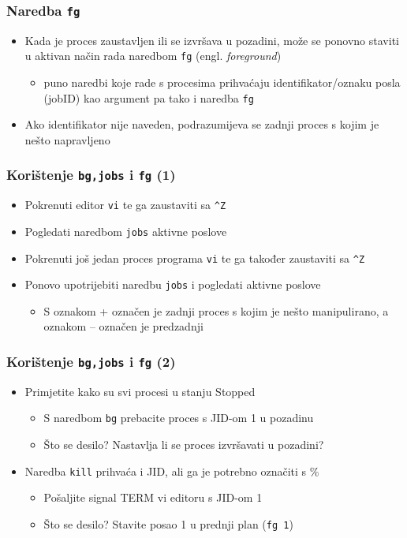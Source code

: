 \documentclass[table,usenames,dvipsnames]{beamer}
\newcommand{\shell}[1]{\texttt{#1}}
\begin{document}
\begin{frame}[t]
\frametitle{Naredba \shell{fg}}
\begin{itemize}
  \item Kada je proces zaustavljen ili se izvršava u pozadini, 
        može se ponovno staviti u aktivan način rada naredbom \shell{fg} 
        (engl. \emph{foreground})
  \begin{itemize}
    \item puno naredbi koje rade s procesima prihvaćaju identifikator/oznaku 
          posla (jobID) kao argument pa tako i naredba \shell{fg}
  \end{itemize}
  \item Ako identifikator nije naveden, podrazumijeva se zadnji proces s kojim 
        je nešto napravljeno
\end{itemize}
\end{frame}

\begin{frame}[t]
\frametitle{Korištenje \shell{bg,jobs} i \shell{fg} (1)}
\begin{itemize}
  \item Pokrenuti editor \shell{vi} te ga zaustaviti sa 
        \shell{\textasciicircum{}Z}
  \item Pogledati naredbom \shell{jobs} aktivne poslove
  \item Pokrenuti još jedan proces programa \shell{vi} te ga također zaustaviti
        sa \shell{\textasciicircum{}Z}
  \item Ponovo upotrijebiti naredbu \shell{jobs} i pogledati aktivne poslove
  \begin{itemize}
    \item S oznakom + označen je zadnji proces s kojim je nešto manipulirano, 
          a oznakom – označen je predzadnji
  \end{itemize}
\end{itemize}
\end{frame}

\begin{frame}[t]
\frametitle{Korištenje \shell{bg,jobs} i \shell{fg} (2)}
\begin{itemize}
  \item Primjetite kako su svi procesi u stanju Stopped
  \begin{itemize}
    \item S naredbom \shell{bg} prebacite proces s JID-om 1 u pozadinu
    \item Što se desilo? Nastavlja li se proces izvršavati u pozadini?
  \end{itemize}
  \item Naredba \shell{kill} prihvaća i JID, ali ga je potrebno označiti s \%
  \begin{itemize}
    \item Pošaljite signal TERM vi editoru s JID-om 1
    \item Što se desilo? Stavite posao 1 u prednji plan (\shell{fg 1})
  \end{itemize}
\end{itemize}
\end{frame}
\end{document}
